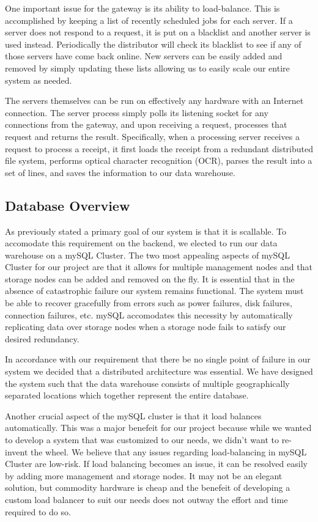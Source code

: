 One important issue for the gateway is its ability to
load-balance. This is accomplished by keeping a list of recently
scheduled jobs for each server. If a server does not respond to a
request, it is put on a blacklist and another server is used
instead. Periodically the distributor will check its blacklist to see
if any of those servers have come back online. New servers can be
easily added and removed by simply updating these lists allowing us to
easily scale our entire system as needed.

The servers themselves can be run on effectively any hardware with an
Internet connection. The server process simply polls its listening
socket for any connections from the gateway, and upon receiving a
request, processes that request and returns the result. Specifically,
when a processing server receives a request to process a receipt, it
first loads the receipt from a redundant distributed file system,
performs optical character recognition (OCR), parses the result into a
set of lines, and saves the information to our data warehouse.

\subsection{Database Overview}
\label{sec:overview.db}

As previously stated a primary goal of our system is that it is scallable.  To accomodate this requirement on the backend, we elected to run our data warehouse on a mySQL Cluster.  The two most appealing aspects of mySQL Cluster for our project are that it allows for multiple management nodes and that storage nodes can be added and removed on the fly.  It is essential that in the absence of catastrophic failure our system remains functional.  The system must be able to recover gracefully from errors such as power failures, disk failures, connection failures, etc.  mySQL accomodates this necessity by automatically replicating data over storage nodes when a storage node fails to satisfy our desired redundancy.

In accordance with our requirement that there be no single point of failure in our system we decided that a distributed architecture was essential.  We have designed the system such that the data warehouse consists of multiple geographically separated locations which together represent the entire database.

Another crucial aspect of the mySQL cluster is that it load balances automatically.  This was a major benefeit for our project because while we wanted to develop a system that was customized to our needs, we didn't want to re-invent the wheel.  We believe that any issues regarding load-balancing in mySQL Cluster are low-risk.  If load balancing becomes an issue, it can be resolved easily by adding more management and storage nodes.  It may not be an elegant solution, but commodity hardware is cheap and the benefeit of developing a custom load balancer to suit our needs does not outway the effort and time required to do so.

